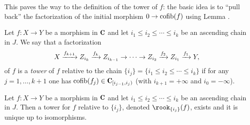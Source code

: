 \documentclass[a4paper,12pt]{amsart}
\begin{document}
This paves the way to the definition of the tower of $f$: the basic idea is to ``pull back'' the factorization of the initial morphism $0\to \operatorname{cofib}(f)$ using Lemma .
\begin{definition} \label{tower.of.f}Let $f\colon X\to Y$ be a morphism in $\C$ and let $i_1\leq i_2\leq\cdots \leq i_k$ be an ascending chain in $J$. We say that a factorization 
\[
X \xrightarrow{f_{k+1}} Z_{i_k} \xrightarrow{f_k}Z_{i_{k-1}}\to\dots\to Z_{i_{2}} \xrightarrow{f_2} Z_{i_1} \xrightarrow{f_1} Y,
\]
of $f$ is a \emph{tower} of $f$ relative to the chain $\{i_j\} = \{i_1\leq i_2\leq\cdots \leq i_k\}$ if for any $j=1,\dots,k+1$ one has
$\cofib(f_j)\in \C_{[i_{j-1},i_j)}$ (with $i_{k+1}=+\infty$ and $i_0=-\infty$).
\end{definition}
\begin{proposition}\label{prop:perPostnikov} Let $f\colon X\to Y$ be a morphism in $\C$ and let $i_1\leq i_2\leq\cdots \leq i_k$ be an ascending chain in $J$. Then a tower for $f$ relative to $\{i_j\}$, denoted $\rook_{\{i_j\}}(f)$, exists and it is unique up to isomorphisms.
\end{proposition}
\end{document}
